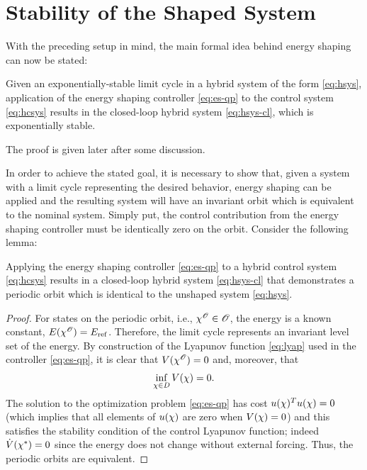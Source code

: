 \section{Stability of the Shaped System} \label{sec:stab}

With the preceding setup in mind, the main formal idea behind energy shaping can now be stated:\vgap
%
\begin{theorem}
  \label{theorem:main-theorem}
  Given an exponentially-stable limit cycle in a hybrid system of the form \eqref{eq:hsys}, application of the energy shaping controller \eqref{eq:es-qp} to the control system \eqref{eq:hcsys} results in the closed-loop hybrid system \eqref{eq:hsys-cl}, which is exponentially stable.\vgap
\end{theorem}
%

The proof is given later after some discussion.


In order to achieve the stated goal, it is necessary to show that, given a system with a limit cycle representing the desired behavior, energy shaping can be applied and the resulting system will have an invariant orbit which is equivalent to the nominal system. Simply put, the control contribution from the energy shaping controller must be identically zero on the orbit. Consider the following lemma:\vgap

\begin{lemma}
  Applying the energy shaping controller \eqref{eq:es-qp} to a hybrid control system \eqref{eq:hcsys} results in a closed-loop hybrid system \eqref{eq:hsys-cl} that demonstrates a periodic orbit which is identical to the unshaped system \eqref{eq:hsys}.\vgap
\end{lemma}

\begin{proof}
  For states on the periodic orbit, i.e., $\chi^{\mathscr{O}} \in \mathscr{O}$, the energy is a known constant, $E(\chi^{\mathscr{O}}) = E_{\mathrm{ref}}$.
  Therefore, the limit cycle represents an invariant level set of the energy.
  By construction of the Lyapunov function \eqref{eq:lyap} used in the controller \eqref{eq:es-qp}, it is clear that $V(\chi^{\mathscr{O}}) = 0$ and, moreover, that
  \begin{align}
    \inf_{\chi \in D} V(\chi) = 0.
  \end{align}
  The solution to the optimization problem \eqref{eq:es-qp} has cost $u(\chi)^T u(\chi) = 0$ (which implies that all elements of $u(\chi)$ are zero when $V(\chi) = 0$) and this satisfies the stability condition of the control Lyapunov function;
  indeed ${\dot V}(\chi^{*}) = 0$ since the energy does not change without external forcing.
  Thus, the periodic orbits are equivalent.
\end{proof}

